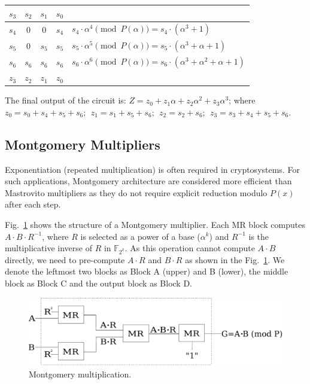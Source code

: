 \begin{Example}
{\vspace{0.05in}

{\small
{\begin{tabular}{|c c c c | l }
  $s_3$   &$s_2$    &$s_1$   &$s_0$   &   \\
 \hline
 $s_4$    &$0$    &$0$   &$s_4$   &$s_4\cdot \alpha^4 \pmod{P(\alpha)} = s_4 \cdot (\alpha^3 + 1)$\\
 $s_5$    &$0$    &$s_5$   &$s_5$     &$s_5\cdot \alpha^5 \pmod{P(\alpha)} = s_5\cdot (\alpha^3+ \alpha + 1)$\\
 $s_6$    &$s_6$    &$s_6$   &$s_6$     &$s_6\cdot \alpha^6 \pmod{ P(\alpha)} = s_6\cdot( \alpha^3 + \alpha^2 + \alpha + 1)$\\
 \hline
 $z_3$    &$z_2$    &$z_1$   &$z_0$   &
 \end{tabular}\par}
}

\vspace{0.05in}

The final output of the circuit is: $Z = z_0 + z_1 \alpha + z_2
\alpha^2 + z_3 \alpha^3$; where  $z_0=s_0+s_4+s_5+s_6; ~~z_1=s_1+s_5+s_6;
~~z_2=s_2+s_6; ~~z_3=s_3+s_4+s_5+s_6$. 
}
\end{Example}

\subsection{Montgomery Multipliers}
Exponentiation (repeated multiplication) is often required in cryptosystems.  
For such applications, Montgomery architecture \cite{acar:1998} \cite{wu:2002}
\cite{Knezevic:2008} are considered more efficient than Mastrovito multipliers
as they do not require explicit reduction modulo $P(x)$ after each step.

Fig.~\ref{montfig} shows the structure of a Montgomery
multiplier. Each MR block computes $A\cdot B\cdot R^{-1}$, where $R$
is selected as a power of a base ($\alpha^{k}$) and $R^{-1}$ is the multiplicative 
inverse of $R$ in $\mathbb{F}_{2^k}$. As this operation cannot compute $A\cdot B$
directly, we need to pre-compute $A\cdot R$ and $B\cdot R$ as shown in the Fig.~\ref{montfig}. 
We denote the leftmost
two blocks as Block A (upper) and B (lower), the middle block as Block
C and the output block as Block D.

\begin{figure}[H]
  \centering
  \includegraphics[scale=0.34]{new_mmcircuit-eps-converted-to}
  \caption{Montgomery multiplication.}
  \label{montfig}
  \end{figure}
\vspace{-0.1in}

